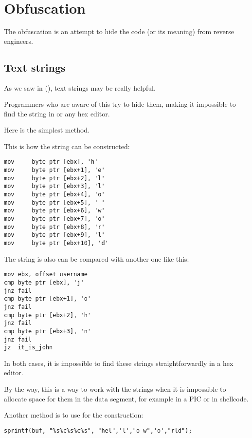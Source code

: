 \chapter{Obfuscation}

The obfuscation is an attempt to hide the code (or its meaning) from reverse engineers.

\section{Text strings}

As we saw in (), text strings may be really helpful.

Programmers who are aware of this try to hide them, making it impossible to find the string in \IDA{} or any hex editor.

Here is the simplest method.

This is how the string can be constructed:

\begin{lstlisting}
mov     byte ptr [ebx], 'h'
mov     byte ptr [ebx+1], 'e'
mov     byte ptr [ebx+2], 'l'
mov     byte ptr [ebx+3], 'l'
mov     byte ptr [ebx+4], 'o'
mov     byte ptr [ebx+5], ' '
mov     byte ptr [ebx+6], 'w'
mov     byte ptr [ebx+7], 'o'
mov     byte ptr [ebx+8], 'r'
mov     byte ptr [ebx+9], 'l'
mov     byte ptr [ebx+10], 'd'
\end{lstlisting}

The string is also can be compared with another one like this:

\begin{lstlisting}
mov	ebx, offset username
cmp	byte ptr [ebx], 'j'
jnz	fail
cmp	byte ptr [ebx+1], 'o'
jnz	fail
cmp	byte ptr [ebx+2], 'h'
jnz	fail
cmp	byte ptr [ebx+3], 'n'
jnz	fail
jz	it_is_john
\end{lstlisting}

In both cases, it is impossible to find these strings straightforwardly in a hex editor.


By the way, this is a way to work with the strings when it is impossible
to allocate space for them in the data segment, for example in a \ac{PIC} or in shellcode.

Another method is to use  
for the construction:

\begin{lstlisting}
sprintf(buf, "%s%c%s%c%s", "hel",'l',"o w",'o',"rld");
\end{lstlisting}

